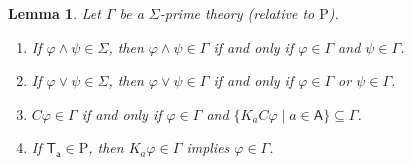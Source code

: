 \documentclass{myifcolog}
\newcommand\C {C}
\newcommand{\K}{K}
\newcommand\A{\mathsf{A}}
\newcommand{\agi}{a}
\newtheorem{lemma}[theorem]{Lemma}
\numberwithin{theorem}{section}
\begin{document}
\begin{lemma}\label{l: properties of prime theories}
    Let $\Gamma$ be a $\Sigma$-prime theory (relative to $\mathrm{P}$).
    \begin{enumerate}
        \item\label{l: properties of prime theories, Item 1} If $\varphi \wedge \psi \in \Sigma$, then $\varphi \wedge \psi \in \Gamma$ if and only if $\varphi \in \Gamma$ and $\psi \in \Gamma$.
        \item\label{l: properties of prime theories, Item 2} If $\varphi \vee \psi \in \Sigma$, then $\varphi \vee \psi \in \Gamma$ if and only if $\varphi \in \Gamma$ or $\psi \in \Gamma$.
        \item\label{l: properties of prime theories, Item 3}  $\C \varphi \in \Gamma$ if and only if $\varphi \in \Gamma$ and $\{\K_\agi \C \varphi \mid \agi \in \A\} \subseteq  \Gamma$.
        \item\label{l: properties of prime theories, Item 4} If $\mathsf{T_\agi} \in \mathrm{P}$, then $\K_\agi \varphi \in \Gamma$ implies $\varphi \in \Gamma$.
    \end{enumerate}
\end{lemma}
\end{document}
